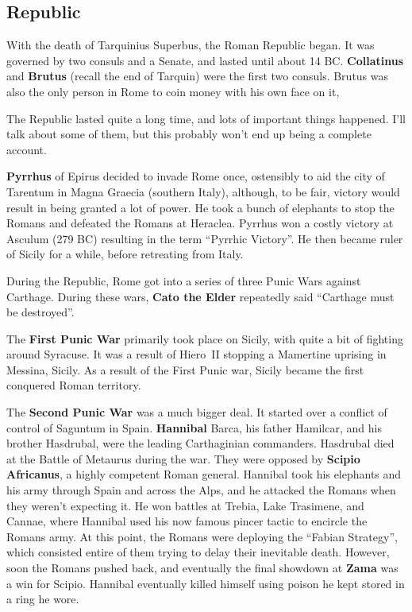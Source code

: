 \subsection*{Republic}

With the death of Tarquinius Superbus, the Roman Republic began.
It was governed by two consuls and a Senate, and lasted until about 14 BC\@.
\textbf{Collatinus} and \textbf{Brutus} (recall the end of Tarquin) were the first two consuls.
Brutus was also the only person in Rome to coin money with his own face on it,

The Republic lasted quite a long time, and lots of important things happened.
I'll talk about some of them, but this probably won't end up being a complete account.

\textbf{Pyrrhus} of Epirus decided to invade Rome once,
ostensibly to aid the city of Tarentum in Magna Graecia (southern Italy),
although, to be fair, victory would result in being granted a lot of power.
He took a bunch of elephants to stop the Romans and defeated the Romans at Heraclea.
Pyrrhus won a costly victory at Asculum (279 BC) resulting in the term ``Pyrrhic Victory''.
He then became ruler of Sicily for a while, before retreating from Italy.

During the Republic, Rome got into a series of three Punic Wars against Carthage.
During these wars, \textbf{Cato the Elder} repeatedly said ``Carthage must be destroyed''.

The \textbf{First Punic War} primarily took place on Sicily,
with quite a bit of fighting around Syracuse.
It was a result of Hiero~II stopping a Mamertine uprising in Messina, Sicily.
As a result of the First Punic war, Sicily became the first conquered Roman territory.

The \textbf{Second Punic War} was a much bigger deal.
It started over a conflict of control of Saguntum in Spain.
\textbf{Hannibal} Barca, his father Hamilcar, and his brother Hasdrubal,
were the leading Carthaginian commanders.
Hasdrubal died at the Battle of Metaurus during the war.
They were opposed by \textbf{Scipio Africanus}, a highly competent Roman general.
Hannibal took his elephants and his army through Spain and across the Alps,
and he attacked the Romans when they weren't expecting it.
He won battles at Trebia, Lake Trasimene, and Cannae,
where Hannibal used his now famous pincer tactic to encircle the Romans army.
At this point, the Romans were deploying the ``Fabian Strategy'',
which consisted entire of them trying to delay their inevitable death.
However, soon the Romans pushed back,
and eventually the final showdown at \textbf{Zama} was a win for Scipio.
Hannibal eventually killed himself using poison he kept stored in a ring he wore.

